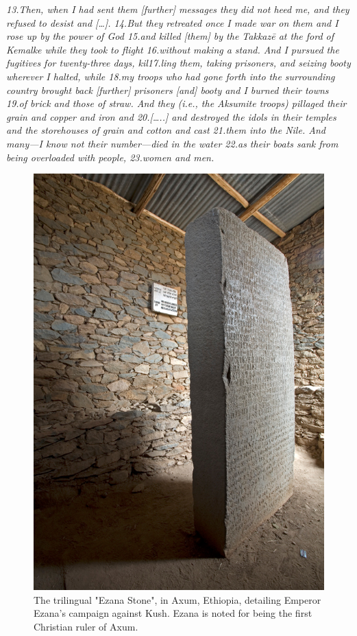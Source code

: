 \documentclass[a4paper,12pt]{scrreprt}
\begin{document}
\begin{center}
\textit{ 13.Then, when I had sent them [further] messages they did not heed me, and they refused to desist and […]. 14.But they retreated once I made war on them and I rose up by the power of God 15.and killed [them] by the Takkazē at the ford of Kemalke while they took to flight 16.without making a stand. And I pursued the fugitives for twenty-three days, kil17.ling them, taking prisoners, and seizing booty wherever I halted, while 18.my troops who had gone forth into the surrounding country brought back [further] prisoners [and] booty and I burned their towns 19.of brick and those of straw. And they (i.e., the Aksumite troops) pillaged their grain and copper and iron and 20.[…..] and destroyed the idols in their temples and the storehouses of grain and cotton and cast 21.them into the Nile. And many—I know not their number—died in the water 22.as their boats sank from being overloaded with people, 23.women and men.}\\[12pt]
\end{center}

\begin{figure}[H]
	\centering
	\includegraphics[width=\textwidth]{img/trilingual_ezana_stone}
	\caption{The trilingual "Ezana Stone", in Axum, Ethiopia, detailing Emperor Ezana's campaign against Kush. Ezana is noted for being the first Christian ruler of Axum.}
\end{figure}
\end{document}
